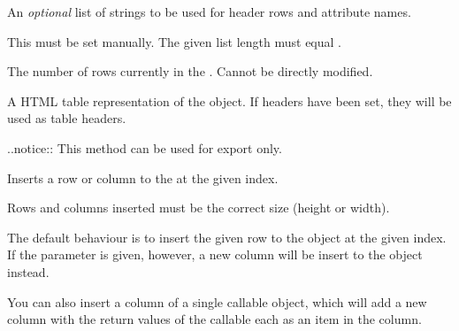 \documentclass[a4paper,12pt,english]{sphinxmanual}
\begin{document}
\begin{fulllineitems}

\begin{fulllineitems}
\label{api:tablib.Dataset.headers}
An \emph{optional} list of strings to be used for header rows and attribute names.

This must be set manually. The given list length must equal {\hyperref[api:tablib.Dataset.width]{}}.

\end{fulllineitems}


\begin{fulllineitems}
\label{api:tablib.Dataset.height}
The number of rows currently in the {\hyperref[api:tablib.Dataset]{}}.
Cannot be directly modified.

\end{fulllineitems}


\begin{fulllineitems}
\label{api:tablib.Dataset.html}
A HTML table representation of the {\hyperref[api:tablib.Dataset]{}} object. If
headers have been set, they will be used as table headers.

..notice:: This method can be used for export only.

\end{fulllineitems}


\begin{fulllineitems}
\label{api:tablib.Dataset.insert}
Inserts a row or column to the {\hyperref[api:tablib.Dataset]{}} at the given index.

Rows and columns inserted must be the correct size (height or width).

The default behaviour is to insert the given row to the {\hyperref[api:tablib.Dataset]{}}
object at the given index. If the  parameter is given, however,
a new column will be insert to the {\hyperref[api:tablib.Dataset]{}} object instead.

You can also insert a column of a single callable object, which will
add a new column with the return values of the callable each as an
item in the column.


\end{fulllineitems}
\end{fulllineitems}
\end{document}
